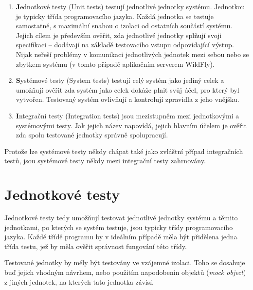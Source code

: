 \begin{enumerate}
  
  \item {\textbf Jednotkové testy (Unit tests)} testují jednotlivé jednotky systému. Jednotkou je typicky třída programovacího jazyka. Každá jednotka se testuje samostatně, s maximální snahou o izolaci od ostatních součástí systému. Jejich cílem je především ověřit, zda jednotlivé jednotky splňují svoji specifikaci -- dodávají na základě testovacího vstupu odpovídající výstup. Nijak neřeší problémy v komunikaci jednotlivých jednotek mezi sebou nebo se zbytkem systému (v tomto případě aplikačním serverem WildFly). \cite{testsTypes}\cite{ivsTest}
  
  \item {\textbf Systémové testy (System tests)} testují celý systém jako jediný celek a umožňují ověřit zda systém jako celek dokáže plnit svůj účel, pro který byl vytvořen. Testovaný systém ovlivňují a kontrolují zpravidla z jeho vnějšku. \cite{testsTypes}\cite{ivsTest}
  
  \item {\textbf Integrační testy (Integration tests)} jsou mezistupněm mezi jednotkovými a systémovými testy. Jak jejich název napovídá, jejich hlavním účelem je ověřit zda spolu testované jednotky správně spolupracují. \cite{testsTypes}\cite{ivsTest}
  
\end{enumerate}

Protože lze systémové testy někdy chápat také jako zvláštní případ integračních testů, jsou systémové testy někdy mezi integrační testy zahrnovány. \cite{testsUnitVsInteg}

\section{Jednotkové testy}

Jednotkové testy tedy umožňují testovat jednotlivé jednotky systému a těmito jednotkami, po kterých se systém testuje, jsou typicky třídy programovacího jazyka. Každé třídě programu by v ideálním případě měla být přidělena jedna třída testu, jež by měla ověřit správnost fungování této třídy. \cite{ivsTest}

Testované jednotky by měly být testovány ve vzájemné izolaci. Toho se dosahuje buď jejich vhodným návrhem, nebo použitím napodobenin objektů ({\it mock object}) z jiných jednotek, na kterých tato jednotka závisí. \cite{ivsTest}


